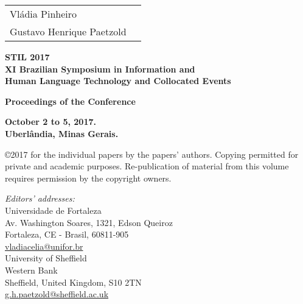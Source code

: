 \documentclass[english, titlepage, a4paper]{lni}
\newcommand{\headruleon}{\renewcommand{\headrulewidth}{0.6pt}}
\begin{document}
 



{\large\sffamily
  \begin{tabular}{@{}l@{\ \ \ \ }l}
		Vl\'adia Pinheiro\\
    Gustavo Henrique Paetzold \\
  \end{tabular}
}

\vspace{5.5cm}

{\LARGE\bf\sffamily
STIL 2017\\[0.7em]
XI Brazilian Symposium in Information and \\ Human Language Technology and Collocated Events
}

\vspace{0.8cm}

{\LARGE\bf\sffamily
Proceedings of the Conference
}

\vspace{0.5cm}

{\large\bf\sffamily
October 2 to 5, 2017.\\
Uberl\^andia, Minas Gerais.
}



\newpage
\null \vfill{
  \copyright 2017 for the individual papers by the papers'
  authors. Copying permitted for private and academic
  purposes. Re-publication of material from this volume requires
  permission by the copyright owners.

  \emph{Editors' addresses:}\\[0.5em]
  Universidade de Fortaleza \\
  Av. Washington Soares, 1321, Edson Queiroz  \\
  Fortaleza, CE - Brasil, 60811-905\\
  \url{vladiacelia@unifor.br}\\

  University of Sheffield \\
  Western Bank \\
  Sheffield, United Kingdom, S10 2TN\\
  \url{g.h.paetzold@sheffield.ac.uk}
}

\newpage
\cfoot{\thepage}
\fancyhead[L]{\rightmark}
\headruleon
\end{document}
